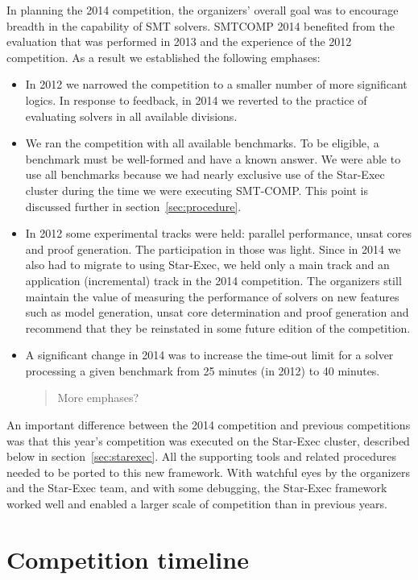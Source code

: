 \documentclass[twosize,11pt]{article}
\newcommand{\comment}[2]{\begin{quote}\sc #1\marginpar{\textcolor{red}{$\ast^{\mbox{#2}}$}}\end{quote}}
\newcommand{\davidc}[1]{\comment{#1}{DC}}
\begin{document}
In planning the 2014 competition, the organizers' overall goal was to encourage breadth
in the capability of SMT solvers. SMTCOMP 2014 benefited from the evaluation that was performed in 2013 and the experience of the 2012 competition. As a result we established the following emphases:
\begin{itemize}
\item In 2012 we narrowed the competition to a smaller number of more significant logics. In response to feedback, in 2014 we reverted to the practice of evaluating solvers in all available divisions.
\item We ran the competition with all available benchmarks. To be eligible, a benchmark must be well-formed and have a known answer. We were able to use all benchmarks because we had nearly exclusive use of the Star-Exec cluster during the time we were executing SMT-COMP. This point is discussed further in section~\ref{sec:procedure}.
\item In 2012 some experimental tracks were held: parallel performance, unsat cores and proof generation. The participation in those was light. Since in 2014 we also had to migrate to using Star-Exec, we held only a main track and an application (incremental) track in the 2014 competition. The organizers still maintain the value of measuring the performance of solvers on new features such as model generation, unsat core determination and proof generation and recommend that they be reinstated in some future edition of the competition.
\item A significant change in 2014 was to increase the time-out limit for a solver processing a given benchmark from 25 minutes (in 2012) to 40 minutes.

\davidc{More emphases?}

\end{itemize}

An important difference between the 2014 competition and previous competitions was that this year's competition was executed on the Star-Exec cluster, described below in section~\ref{sec:starexec}. All the supporting tools and related procedures needed to be ported to this new framework. With watchful eyes by the organizers and the Star-Exec team, and with some debugging, the Star-Exec framework worked well and enabled a larger scale of competition than in previous years.

\section{Competition timeline}
\label{sec:timeline}
\end{document}
